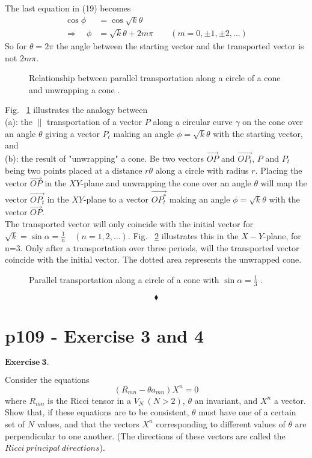 The last equation in (19) becomes
\begin{align*}
\cos{\phi} &= \cos{\sqrt{k}\theta} \\
\Rightarrow \quad \phi &= \sqrt{k}\theta + 2m\pi\quad\quad (m= 0,\pm 1,\pm 2, \dots)
\end{align*}
So for $\theta = 2\pi$ the angle between the starting vector and the transported vector is not $2m\pi$. 
\begin{figure}[H]%
    \centering
    \subfloat[]{}
	\qquad
    \subfloat[]{}
\caption{Relationship between parallel transportation along a circle of a cone and unwrapping a cone .}
\label{fig:fig_p108_Ex2_b2}
\end{figure}
Fig. ~\ref{fig:fig_p108_Ex2_b2} illustrates the analogy between\\ 
(a): the $\parallel$ transportation of a vector $P$ along a circular curve $\gamma$ on the cone over an angle $\theta$ giving a vector $P_t$ making an angle $\phi = \sqrt{k}\theta$ with the starting vector, and \\
(b): the result of "unwrapping" a cone. Be two vectors $\overrightarrow{OP}$ and $\overrightarrow{OP_t}$, $P$ and $P_t$ being two points placed at a distance $r\theta$ along a circle  with radius $r$. Placing the vector $\overrightarrow{OP}$ in the $XY$-plane and unwrapping the cone over an angle $\theta$ will map the vector $\overrightarrow{OP_t}$ in the $XY$-plane to a vector $\overrightarrow{OP_t^{*}}$ making an angle $\phi = \sqrt{k}\theta$ with the vector $\overrightarrow{OP}$.\\
The transported vector will only coincide with the initial vector for $\sqrt{k}=\sin{\alpha}  = \frac{1}{n}\quad (n= 1, 2, \dots)$. Fig. ~\ref{fig:fig_p108_Ex2_b3} illustrates this in the $X-Y$-plane,  for n=3. Only after a transportation over three periods, will the transported vector coincide with the initial vector. The dotted area represents the unwrapped cone.
\begin{figure}[H]%
    \centering
{}
\caption{Parallel transportation along a circle of a cone with $\sin{\alpha}  = \frac{1}{3}$ .}
\label{fig:fig_p108_Ex2_b3}
\end{figure}
$$\blacklozenge$$
\newpage

\section{p109 - Exercise 3 and 4}
$\mathbf{Exercise \ 3.}$\\
\begin{tcolorbox}
Consider the equations $$ \left( R_{mn} -\theta a_{mn}\right)X^n = 0$$ where $R_{mn}$ is the Ricci tensor in a $V_N \ (N>2)$, $\theta$ an invariant, and $X^n$ a vector. Show that, if these equations are to be consistent, $\theta$ must have one of a certain set of $N$ values, and that the vectors $X^n$ corresponding to different values of $\theta$ are perpendicular to one another. (The directions of these vectors are called the $\mathit{Ricci \ principal \ directions}$).
\end{tcolorbox}

